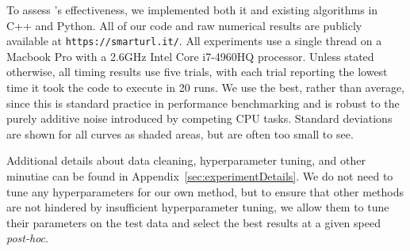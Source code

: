 
To assess \ours's effectiveness, we implemented both it and existing algorithms in C++ and Python. All of our code and raw numerical results are publicly available at \texttt{https://smarturl.it/\ours}. All experiments use a single thread on a Macbook Pro with a 2.6GHz Intel Core i7-4960HQ processor. Unless stated otherwise, all timing results use five trials, with each trial reporting the lowest time it took the code to execute in 20 runs. We use the best, rather than average, since this is standard practice in performance benchmarking and is robust to the purely additive noise introduced by competing CPU tasks. Standard deviations are shown for all curves as shaded areas, but are often too small to see.


Additional details about data cleaning, hyperparameter tuning, and other minutiae can be found in Appendix~\ref{sec:experimentDetails}. We do not need to tune any hyperparameters for our own method, but to ensure that other methods are not hindered by insufficient hyperparameter tuning, we allow them to tune their parameters on the test data and select the best results at a given speed \textit{post-hoc}.



